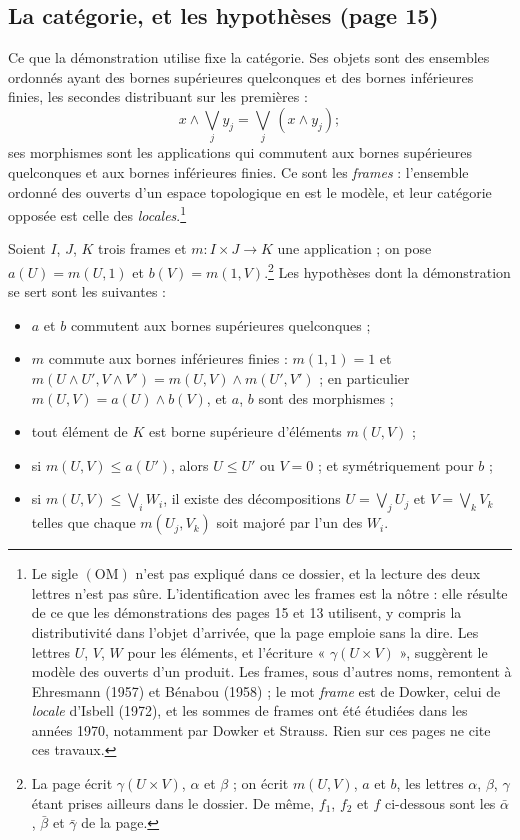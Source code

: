 \documentclass[11pt,a4paper]{article}
\begin{document}
\subsection*{La catégorie, et les hypothèses (page 15)}

Ce que la démonstration utilise fixe la catégorie. Ses objets sont des
ensembles ordonnés ayant des bornes supérieures quelconques et des bornes
inférieures finies, les secondes distribuant sur les premières :
\[
x \wedge \bigvee_j y_j = \bigvee_j\, (x \wedge y_j) ;
\]
ses morphismes sont les applications qui commutent aux bornes supérieures
quelconques et aux bornes inférieures finies. Ce sont les \emph{frames} :
l'ensemble ordonné des ouverts d'un espace topologique en est le modèle, et
leur catégorie opposée est celle des \emph{locales}.\footnote{Le sigle
$(\mathrm{OM})$ n'est pas expliqué dans ce dossier, et la lecture des deux
lettres n'est pas sûre. L'identification avec les frames est la nôtre :
elle résulte de ce que les démonstrations des pages 15 et 13 utilisent,
y compris la distributivité dans l'objet d'arrivée, que la page emploie sans
la dire. Les lettres $U$, $V$, $W$ pour les éléments, et l'écriture
« $\gamma(U \times V)$ », suggèrent le modèle des ouverts d'un produit. Les
frames, sous d'autres noms, remontent à Ehresmann (1957) et Bénabou (1958) ;
le mot \emph{frame} est de Dowker, celui de \emph{locale} d'Isbell (1972),
et les sommes de frames ont été étudiées dans les années 1970, notamment
par Dowker et Strauss. Rien sur ces pages ne cite ces travaux.}

Soient $I$, $J$, $K$ trois frames et $m : I \times J \to K$ une application ;
on pose $a(U) = m(U, 1)$ et $b(V) = m(1, V)$.\footnote{La page écrit
$\gamma(U \times V)$, $\alpha$ et $\beta$ ; on écrit $m(U,V)$, $a$ et $b$, les
lettres $\alpha$, $\beta$, $\gamma$ étant prises ailleurs dans le dossier. De
même, $f_1$, $f_2$ et $f$ ci-dessous sont les $\bar\alpha$, $\bar\beta$ et
$\bar\gamma$ de la page.} Les hypothèses dont la démonstration se sert sont
les suivantes :

\begin{itemize}
  \item[a)] $a$ et $b$ commutent aux bornes supérieures quelconques ;
  \item[b)] $m$ commute aux bornes inférieures finies :
  $m(1,1) = 1$ et $m(U \wedge U', V \wedge V') = m(U,V) \wedge m(U',V')$ ; en
  particulier $m(U,V) = a(U) \wedge b(V)$, et $a$, $b$ sont des morphismes ;
  \item[c)] tout élément de $K$ est borne supérieure d'éléments $m(U,V)$ ;
  \item[d)] si $m(U,V) \leqslant a(U')$, alors $U \leqslant U'$ ou $V = 0$ ; et
  symétriquement pour $b$ ;
  \item[e)] si $m(U,V) \leqslant \bigvee_i W_i$, il existe des décompositions
  $U = \bigvee_j U_j$ et $V = \bigvee_k V_k$ telles que chaque $m(U_j, V_k)$
  soit majoré par l'un des $W_i$.
\end{itemize}
\end{document}
